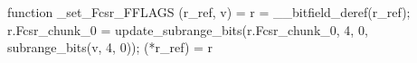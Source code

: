 function _set_Fcsr_FFLAGS (r_ref, v) = {
    r = __bitfield_deref(r_ref);
    r.Fcsr_chunk_0 = update_subrange_bits(r.Fcsr_chunk_0, 4, 0, subrange_bits(v, 4, 0));
    (*r_ref) = r
}
